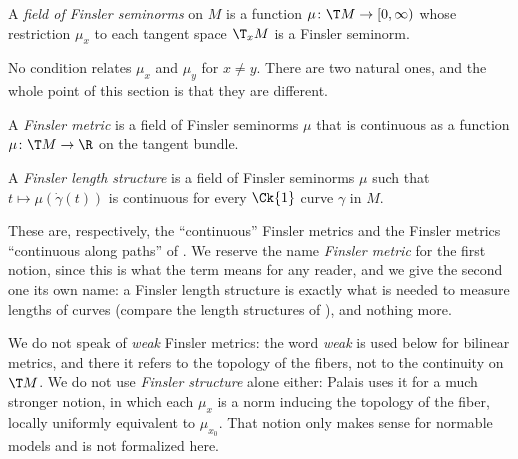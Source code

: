 \begin{definition}
  \label{def:mt-field}
  \leanok
  A \emph{field of Finsler seminorms} on $M$ is a function $\mu \colon \T M \to [0,\infty)$ whose
  restriction $\mu_x$ to each tangent space $\T_x M$ is a Finsler seminorm.
\end{definition}

No condition relates $\mu_x$ and $\mu_y$ for $x \neq y$. There are two natural ones, and the
whole point of this section is that they are different.

\begin{definition}
  \label{def:finsler-metric}
  \leanok
  A \emph{Finsler metric} is a field of Finsler seminorms $\mu$ that is continuous as a function
  $\mu \colon \T M \to \R$ on the tangent bundle.
\end{definition}

\begin{definition}
  \label{def:finsler-length-structure}
  \leanok
  A \emph{Finsler length structure} is a field of Finsler seminorms $\mu$ such that
  $t \mapsto \mu(\dot\gamma(t))$ is continuous for every $\Ck{1}$ curve $\gamma$ in $M$.
\end{definition}

These are, respectively, the ``continuous'' Finsler metrics and the Finsler metrics ``continuous
along paths'' of \cite[Def.~2.3]{Lar19}. We reserve the name \emph{Finsler metric} for the first
notion, since this is what the term means for any reader, and we give the second one its own name:
a Finsler length structure is exactly what is needed to measure lengths of curves (compare the
length structures of \cite[\S2.1.1]{BBI01}), and nothing more.

\begin{remark}
  We do not speak of \emph{weak} Finsler metrics: the word \emph{weak} is used below for bilinear
  metrics, and there it refers to the topology of the fibers, not to the continuity on $\T M$.
  We do not use \emph{Finsler structure} alone either: Palais \cite[Def.~2.1 and 2.6]{Pal66} uses
  it for a much stronger notion, in which each $\mu_x$ is a norm inducing the topology of the
  fiber, locally uniformly equivalent to $\mu_{x_0}$. That notion only makes sense for normable
  models and is not formalized here.
\end{remark}

